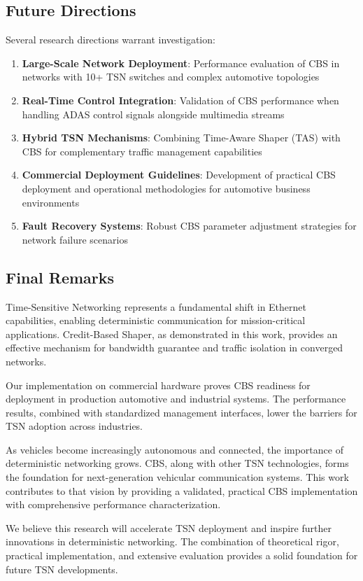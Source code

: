 \documentclass[10pt, journal, compsoc]{IEEEtran}
\begin{document}
\subsection{Future Directions}

Several research directions warrant investigation:

\begin{enumerate}
    \item \textbf{Large-Scale Network Deployment}: Performance evaluation of CBS in networks with 10+ TSN switches and complex automotive topologies
    \item \textbf{Real-Time Control Integration}: Validation of CBS performance when handling ADAS control signals alongside multimedia streams
    \item \textbf{Hybrid TSN Mechanisms}: Combining Time-Aware Shaper (TAS) with CBS for complementary traffic management capabilities
    \item \textbf{Commercial Deployment Guidelines}: Development of practical CBS deployment and operational methodologies for automotive business environments
    \item \textbf{Fault Recovery Systems}: Robust CBS parameter adjustment strategies for network failure scenarios
\end{enumerate}

\subsection{Final Remarks}

Time-Sensitive Networking represents a fundamental shift in Ethernet capabilities, enabling deterministic communication for mission-critical applications. Credit-Based Shaper, as demonstrated in this work, provides an effective mechanism for bandwidth guarantee and traffic isolation in converged networks.

Our implementation on commercial hardware proves CBS readiness for deployment in production automotive and industrial systems. The performance results, combined with standardized management interfaces, lower the barriers for TSN adoption across industries.

As vehicles become increasingly autonomous and connected, the importance of deterministic networking grows. CBS, along with other TSN technologies, forms the foundation for next-generation vehicular communication systems. This work contributes to that vision by providing a validated, practical CBS implementation with comprehensive performance characterization.

We believe this research will accelerate TSN deployment and inspire further innovations in deterministic networking. The combination of theoretical rigor, practical implementation, and extensive evaluation provides a solid foundation for future TSN developments.



\end{document}
